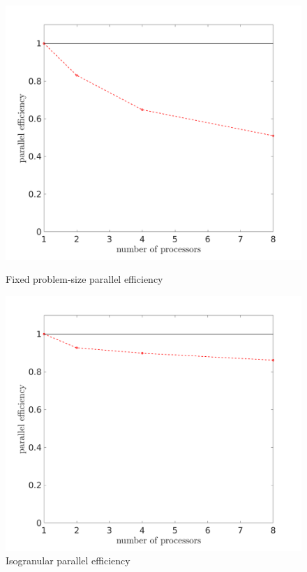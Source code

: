\documentclass[11pt, oneside]{article}   	%
\begin{document}
\begin{figure}[!htbp]
	\centering
	\begin{minipage}{0.45\textwidth}
		\centering
		\includegraphics[width=1.2\textwidth]{fixed_probsize_Eff.png} %
		\caption{Fixed problem-size parallel efficiency}
	\end{minipage}\hfill
	\begin{minipage}{0.48\textwidth}
		\centering
		\includegraphics[width=1.2\textwidth]{isogranular_Eff.png} %
		\caption{Isogranular parallel efficiency}
	\end{minipage}
\end{figure}
\end{document}
